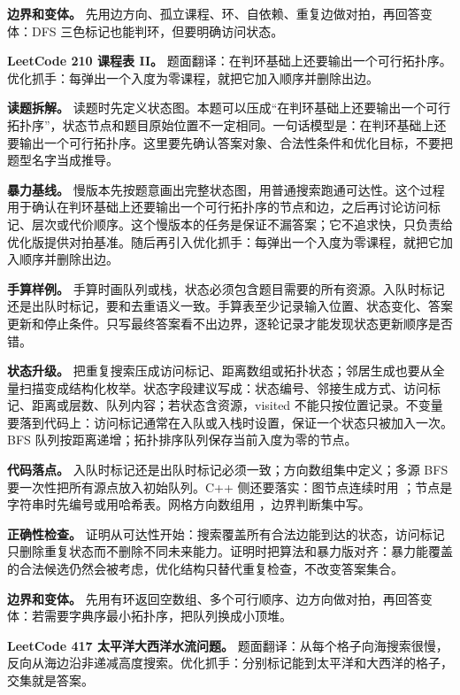\textbf{边界和变体。} 先用边方向、孤立课程、环、自依赖、重复边做对拍，再回答变体：DFS 三色标记也能判环，但要明确访问状态。

\noindent\textbf{LeetCode 210 课程表 II。} 题面翻译：在判环基础上还要输出一个可行拓扑序。优化抓手：每弹出一个入度为零课程，就把它加入顺序并删除出边。

\textbf{读题拆解。} 读题时先定义状态图。本题可以压成“在判环基础上还要输出一个可行拓扑序”，状态节点和题目原始位置不一定相同。一句话模型是：在判环基础上还要输出一个可行拓扑序。这里要先确认答案对象、合法性条件和优化目标，不要把题型名字当成推导。

\textbf{暴力基线。} 慢版本先按题意画出完整状态图，用普通搜索跑通可达性。这个过程用于确认在判环基础上还要输出一个可行拓扑序的节点和边，之后再讨论访问标记、层次或代价顺序。这个慢版本的任务是保证不漏答案；它不追求快，只负责给优化版提供对拍基准。随后再引入优化抓手：每弹出一个入度为零课程，就把它加入顺序并删除出边。

\textbf{手算样例。} 手算时画队列或栈，状态必须包含题目需要的所有资源。入队时标记还是出队时标记，要和去重语义一致。手算表至少记录输入位置、状态变化、答案更新和停止条件。只写最终答案看不出边界，逐轮记录才能发现状态更新顺序是否错。

\textbf{状态升级。} 把重复搜索压成访问标记、距离数组或拓扑状态；邻居生成也要从全量扫描变成结构化枚举。状态字段建议写成：状态编号、邻接生成方式、访问标记、距离或层数、队列内容；若状态含资源，visited 不能只按位置记录。不变量要落到代码上：访问标记通常在入队或入栈时设置，保证一个状态只被加入一次。BFS 队列按距离递增；拓扑排序队列保存当前入度为零的节点。

\textbf{代码落点。} 入队时标记还是出队时标记必须一致；方向数组集中定义；多源 BFS 要一次性把所有源点放入初始队列。C++ 侧还要落实：图节点连续时用 ；节点是字符串时先编号或用哈希表。网格方向数组用 ，边界判断集中写。

\textbf{正确性检查。} 证明从可达性开始：搜索覆盖所有合法边能到达的状态，访问标记只删除重复状态而不删除不同未来能力。证明时把算法和暴力版对齐：暴力能覆盖的合法候选仍然会被考虑，优化结构只替代重复检查，不改变答案集合。

\textbf{边界和变体。} 先用有环返回空数组、多个可行顺序、边方向做对拍，再回答变体：若需要字典序最小拓扑序，把队列换成小顶堆。

\noindent\textbf{LeetCode 417 太平洋大西洋水流问题。} 题面翻译：从每个格子向海搜索很慢，反向从海边沿非递减高度搜索。优化抓手：分别标记能到太平洋和大西洋的格子，交集就是答案。

